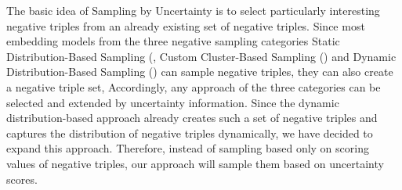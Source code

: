 The basic idea of Sampling by Uncertainty is to select particularly interesting negative triples from an already existing set of negative triples.
Since most embedding models from the three negative sampling categories Static Distribution-Based Sampling (, 
Custom Cluster-Based Sampling () and 
Dynamic Distribution-Based Sampling ()
can sample negative triples, they can also create a negative triple set,
Accordingly, any approach of the three categories  can be selected and extended by uncertainty information.
Since the dynamic distribution-based approach \kbgan already creates such a set of negative triples and captures the distribution of negative triples dynamically, we have decided to expand this approach.
Therefore, instead of sampling based only on scoring values of negative triples, our approach will sample them based on uncertainty scores.












